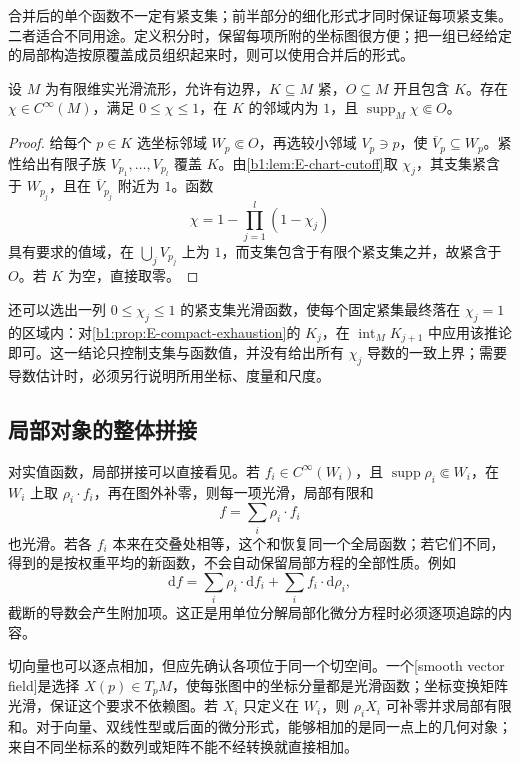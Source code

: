 合并后的单个函数不一定有紧支集；前半部分的细化形式才同时保证每项紧支集。二者适合不同用途。定义积分时，保留每项所附的坐标图很方便；把一组已经给定的局部构造按原覆盖成员组织起来时，则可以使用合并后的形式。

\begin{corollary}[任意紧集的光滑截断]\label{b1:cor:E-compact-cutoff}
设 \(M\) 为有限维实光滑流形，允许有边界，\(K\subseteq M\) 紧，\(O\subseteq M\) 开且包含 \(K\)。存在 \(\chi\in C^\infty(M)\)，满足 \(0\leq\chi\leq1\)，在 \(K\) 的邻域内为 \(1\)，且 \(\operatorname{supp}_M\chi\Subset O\)。
\end{corollary}
\begin{proof}
给每个 \(p\in K\) 选坐标邻域 \(W_p\Subset O\)，再选较小邻域 \(V_p\ni p\)，使 \(\overline V_p\subseteq W_p\)。紧性给出有限子族 \(V_{p_1},\ldots,V_{p_l}\) 覆盖 \(K\)。由\cref{b1:lem:E-chart-cutoff}取 \(\chi_j\)，其支集紧含于 \(W_{p_j}\)，且在 \(\overline V_{p_j}\) 附近为 \(1\)。函数
\[
 \chi=1-\prod_{j=1}^l(1-\chi_j)
\]
具有要求的值域，在 \(\bigcup_jV_{p_j}\) 上为 \(1\)，而支集包含于有限个紧支集之并，故紧含于 \(O\)。若 \(K\) 为空，直接取零。
\end{proof}

还可以选出一列 \(0\leq\chi_j\leq1\) 的紧支集光滑函数，使每个固定紧集最终落在 \(\chi_j=1\) 的区域内：对\cref{b1:prop:E-compact-exhaustion}的 \(K_j\)，在 \(\operatorname{int}_M K_{j+1}\) 中应用该推论即可。这一结论只控制支集与函数值，并没有给出所有 \(\chi_j\) 导数的一致上界；需要导数估计时，必须另行说明所用坐标、度量和尺度。

\subsection{局部对象的整体拼接}
\label{b1:subsec:E10204}

对实值函数，局部拼接可以直接看见。若 \(f_i\in C^\infty(W_i)\)，且 \(\operatorname{supp}\rho_i\Subset W_i\)，在 \(W_i\) 上取 \(\rho_i\cdot f_i\)，再在图外补零，则每一项光滑，局部有限和
\[
 f=\sum_i\rho_i\cdot f_i
\]
也光滑。若各 \(f_i\) 本来在交叠处相等，这个和恢复同一个全局函数；若它们不同，得到的是按权重平均的新函数，不会自动保留局部方程的全部性质。例如
\[
 \mathrm{d}f=\sum_i\rho_i\cdot\mathrm{d}f_i
             +\sum_i f_i\cdot\mathrm{d}\rho_i,
\]
截断的导数会产生附加项。这正是用单位分解局部化微分方程时必须逐项追踪的内容。

\ProseParagraphBreak

切向量也可以逐点相加，但应先确认各项位于同一个切空间。一个[smooth vector field]是选择 \(X(p)\in T_pM\)，使每张图中的坐标分量都是光滑函数；坐标变换矩阵光滑，保证这个要求不依赖图。若 \(X_i\) 只定义在 \(W_i\)，则 \(\rho_i X_i\) 可补零并求局部有限和。对于向量、双线性型或后面的微分形式，能够相加的是同一点上的几何对象；来自不同坐标系的数列或矩阵不能不经转换就直接相加。

